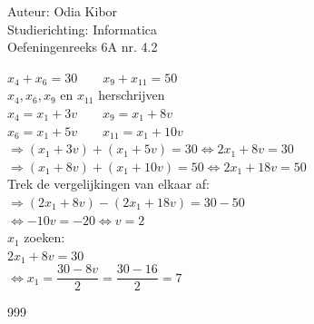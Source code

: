 \documentclass[a4paper]{article}
\begin{document}
  
\noindent \large Auteur: Odia Kibor \\
\noindent \large Studierichting: Informatica\\
\noindent \large Oefeningenreeks 6A nr. 4.2
\\

\medskip

\normalsize


$x_4 + x_6 = 30 \qquad x_9 + x_{11} = 50$\\

$x_4, x_6, x_9$ en $x_{11}$ herschrijven\\

$x_4 =  x_1 + 3v \qquad x_9 = x_1 + 8v$\\

$x_6 =  x_1 + 5v \qquad x_{11} = x_1 + 10v$\\

$\Rightarrow  (x_1 + 3v) + (x_1 + 5v) = 30 \Leftrightarrow 2x_1 + 8v = 30$\\

$\Rightarrow  (x_1 + 8v) + (x_1 + 10v) = 50 \Leftrightarrow 2x_1 + 18v = 50$\\

Trek de vergelijkingen van elkaar af:\\

$\Rightarrow (2x_1 + 8v) - (2x_1 + 18v) = 30 - 50$\\

$\Leftrightarrow -10v = -20 \Leftrightarrow v = 2$\\

$x_1$ zoeken:\\

$2x_1 + 8v = 30$\\

$\Leftrightarrow x_1 = \dfrac{30 - 8v}{2} = \dfrac{30 - 16}{2} = 7$\\




















\begin{thebibliography}{999}
\end{thebibliography}
\end{document}
